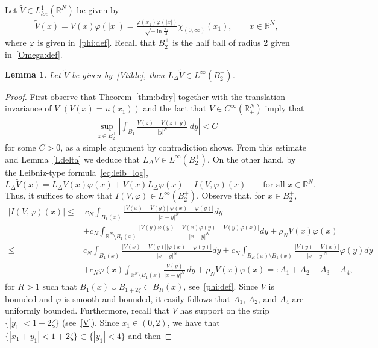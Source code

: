 \documentclass[11pt]{article}
\newcommand{\R}{\mathbb{R}}
\numberwithin{equation}{section}
\newtheorem{lemma}[theorem]{Lemma}
\begin{document}
Let $\widetilde V \in L^1_{loc}(\R^N)$ be given by
\begin{align}\label{Vtilde}
\widetilde V(x)=V(x)\varphi(|x|)=\frac{\varphi(x_1)\varphi(|x|)}{\sqrt{-\ln \frac{x_1}{2}}}\chi_{(0,\infty)}(x_1),\qquad x\in\R^N,
\end{align}
where $\varphi$ is given in~\eqref{phi:def}.  Recall that $B_2^+$ is the half ball of radius 2 given in~\eqref{Omega:def}.
\begin{lemma}\label{V:lem:2}
Let $\widetilde V$ be given by~\eqref{Vtilde}, then $L_\Delta \widetilde V\in L^\infty(B_2^+)$.
\end{lemma}
\begin{proof}
First observe that Theorem~\ref{thm:bdry} together with the translation invariance of $V$ $(V(x)=u(x_1))$ and the fact that $V\in C^\infty(\R^N_+)$ imply that 
\begin{align*}
\sup_{z\in B_2^+}\left|\int_{B_1}
\frac{
V(z)
-V(z+y)}{|y|^N}\, dy\right|<C
\end{align*}
for some $C>0$, as a simple argument by contradiction shows. From this estimate and Lemma~\ref{Ldelta} we deduce that $L_\Delta V \in L^\infty(B_2^+)$. On the other hand, by the Leibniz-type formula~\eqref{eq:leib_log},
\begin{equation*}
    L_\Delta \widetilde V(x) = L_\Delta V(x) \varphi(x) + V(x) L_\Delta \varphi(x) - I(V,\varphi)(x) \qquad \text{for all } x \in \R^N.
\end{equation*}
Thus, it suffices to show that $I(V,\varphi) \in L^\infty(B_2^+)$.  Observe that, for $x\in B_2^+$,
   \begin{align*}
        \left|I(V,\varphi)(x) \right| \le &\ c_{N}\int_{B_{1}(x)}\frac{\left| V(x)-V(y)\right| \left| \varphi(x)-\varphi(y)\right|}{|x-y|^N}dy\\ 
        & +c_{N} \int_{\R^N\setminus B_1(x)}\frac{\left| V(y)\varphi(y)-V(x)\varphi(y)-V(y)\varphi(x) \right|}{|x-y|^N}dy 
        +\rho_{N}V(x)\varphi(x) \\
        \leq \ &c_{N}\int_{B_{1}(x)}\frac{\left| V(x)-V(y)\right| \left| \varphi(x)-\varphi(y)\right|}{|x-y|^N}dy + c_N\int_{B_R(x)\setminus B_1(x)}\frac{\left| V(y)-V(x) \right|}{|x-y|^N} \varphi(y)dy\\ 
        &+c_{N} \varphi(x) \int_{\R^N\setminus B_1(x)}\frac{V(y)}{|x-y|^N} \, dy + \rho_{N}V(x)\varphi(x)=:A_1+A_2+A_3+A_4,
    \end{align*}
    for $R>1$ such that $B_1(x) \cup B_{1+2\zeta} \subset B_R(x)$, see~\eqref{phi:def}.  Since $V$ is bounded and $\varphi$ is smooth and bounded, it easily follows that $A_1$, $A_2$, and $A_4$ are uniformly bounded.  Furthermore, recall that $V$ has support on the strip $\{|y_1|<1+2\zeta\}$ (see~\eqref{V}). Since $x_1\in(0,2)$, we have that $\{|x_1+y_1|<1+2\zeta\}\subset \{|y_1|<4\}$ and then   

\end{proof}
\end{document}
